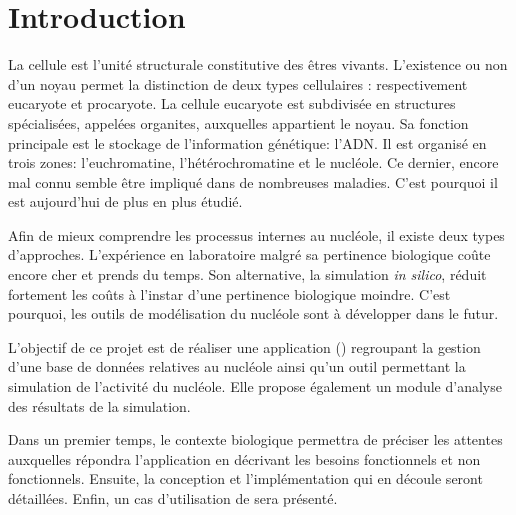 \chapter*{Introduction}

La cellule est l'unité structurale constitutive des êtres
vivants. L'existence ou non d'un noyau permet la distinction de deux
types cellulaires : respectivement eucaryote et procaryote. La cellule
eucaryote est subdivisée en structures spécialisées, appelées
organites, auxquelles appartient le noyau. Sa fonction principale est
le stockage de l'information génétique: l'ADN. Il est organisé en
trois zones: l'euchromatine, l'hétérochromatine et le nucléole. Ce
dernier, encore mal connu semble être impliqué dans de nombreuses
maladies. C'est pourquoi il est aujourd'hui de plus en plus étudié.

Afin de mieux comprendre les processus internes au nucléole, il existe
deux types d'approches. L'expérience en laboratoire malgré sa
pertinence biologique coûte encore cher et prends du temps. Son
alternative, la simulation \textit{in silico}, réduit fortement les
coûts à l'instar d'une pertinence biologique moindre. C'est pourquoi,
les outils de modélisation du nucléole sont à développer dans le
futur.

L'objectif de ce projet est de réaliser une application (\NQ)
regroupant la gestion d'une base de données relatives au nucléole
ainsi qu'un outil permettant la simulation de l'activité du
nucléole. Elle propose également un module d'analyse des résultats de
la simulation.

Dans un premier temps, le contexte biologique permettra de préciser
les attentes auxquelles répondra l'application en décrivant les
besoins fonctionnels et non fonctionnels. Ensuite, la conception et
l'implémentation qui en découle seront détaillées. Enfin, un cas
d'utilisation de \NQ sera présenté.

